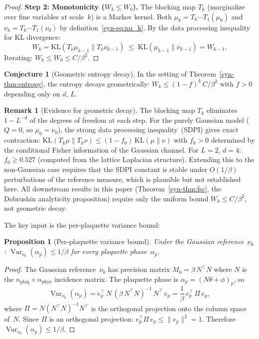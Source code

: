 \documentclass[11pt]{article}
\newtheorem{proposition}[theorem]{Proposition}
\theoremstyle{definition}
\newtheorem{conjecture}[theorem]{Conjecture}
\newtheorem{remark}[theorem]{Remark}
\newcommand{\Var}{\operatorname{Var}}
\newcommand{\KL}{\mathrm{KL}}
\begin{document}
\begin{proof}
\smallskip
\noindent\textbf{Step 2: Monotonicity ($W_k \leq W_0$).}
The blocking map $T_k$ (marginalize over fine variables
at scale~$k$) is a Markov kernel.  Both $\mu_k = T_k
\cdots T_1(\mu_0)$ and $\nu_k = T_k \cdots T_1(\nu_0)$
by definition~\eqref{syn-eq:nu_k}.
By the data processing inequality for KL divergence:
\begin{equation}
  W_k = \KL(T_k \mu_{k-1} \| T_k \nu_{k-1})
  \;\leq\; \KL(\mu_{k-1} \| \nu_{k-1})
  = W_{k-1}.
\end{equation}
Iterating: $W_k \leq W_0 \leq C/\beta^2$.
\end{proof}

\begin{conjecture}[Geometric entropy decay]
\label{syn-conj:entropy_geom}
In the setting of Theorem~\ref{syn-thm:entropy}, the
entropy decays geometrically:
$W_k \leq (1-f)^k\,C/\beta^2$
with $f > 0$ depending only on $d$, $L$.
\end{conjecture}

\begin{remark}[Evidence for geometric decay]
\label{syn-rem:geom_decay}
The blocking map $T_k$ eliminates
$1 - L^{-d}$ of the degrees of freedom at each step.
For the purely Gaussian model ($Q = 0$, so
$\mu_0 = \nu_0$), the strong data processing
inequality~\textup{(}SDPI\textup{)} gives exact
contraction: $\KL(T_k\mu \| T_k\nu)
\leq (1 - f_0)\,\KL(\mu \| \nu)$ with
$f_0 > 0$ determined by the conditional
Fisher information of the Gaussian channel.
For $L = 2$, $d = 4$: $f_0 \geq 0.527$
(computed from the lattice Laplacian structure).
Extending this to the non-Gaussian case requires
that the SDPI constant is stable under
$O(1/\beta)$ perturbations of the reference measure,
which is plausible but not established here.
All downstream results in this paper
\textup{(}Theorem~\ref{syn-thm:fsc},
the Dobrushin analyticity proposition\textup{)}
require only the uniform bound
$W_k \leq C/\beta^2$, not geometric decay.
\end{remark}

The key input is the per-plaquette variance bound:

\begin{proposition}[Per-plaquette variance bound]
\label{syn-prop:plaquette}
Under the Gaussian reference~$\nu_0$:
$\Var_{\nu_0}(\alpha_p) \leq 1/\beta$
for every plaquette phase~$\alpha_p$.
\end{proposition}

\begin{proof}
The Gaussian reference~$\nu_0$ has precision matrix
$M_0 = \beta\,N^\top N$ where $N$ is the
$n_{\mathrm{plaq}} \times n_{\mathrm{phys}}$ incidence
matrix.
The plaquette phase is
$\alpha_p = (N\theta + \phi)_p$, so
\begin{equation}
  \Var_{\nu_0}(\alpha_p)
  = e_p^\top\,N\,(\beta\,N^\top N)^{-1}\,N^\top\,e_p
  = \frac{1}{\beta}\,e_p^\top\,\Pi\,e_p,
\end{equation}
where $\Pi = N(N^\top N)^{-1}N^\top$ is the
orthogonal projection onto the column space of~$N$.
Since $\Pi$ is an orthogonal projection:
$e_p^\top\Pi\,e_p \leq \|e_p\|^2 = 1$.
Therefore $\Var_{\nu_0}(\alpha_p) \leq 1/\beta$.
\end{proof}
\end{document}
